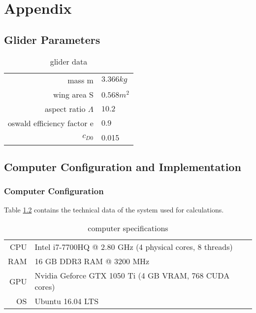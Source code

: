 
\chapter{Appendix}
\section{Glider Parameters}
\label{appendix_A}

\begin{table}[h]
	\begin{center}
		\begin{tabular}{r|l}
			mass m& $3.366 kg$\\
			wing area S & $0.568 m^2$ \\
			aspect ratio $\Lambda$ & $10.2$ \\
			oswald efficiency factor e& $0.9$ \\
			$c_{D0}$ & 0.015 \\
		\end{tabular}
		\caption{glider data}
		\label{tab:glider_data}
	\end{center}
\end{table}

\newpage
\section{Computer Configuration and Implementation}
\label{appendix_B}
\subsection{Computer Configuration}
Table \ref{tab:pc_specs} contains the technical data of the system used for calculations.

\begin{table}[h]
	\begin{center}
		\begin{tabular}{r|l}
			CPU & Intel i7-7700HQ @ 2.80 GHz (4 physical cores, 8 threads) \\
			RAM\nomenclature[A]{RAM}{random access memory} & 16 GB DDR3 RAM @ 3200 MHz \\
			GPU & Nvidia Geforce GTX 1050 Ti (4 GB VRAM, 768 CUDA cores) \\
			OS & Ubuntu 16.04 LTS
		\end{tabular}
	\caption{computer specifications}
	\label{tab:pc_specs}
	\end{center}
\end{table}

